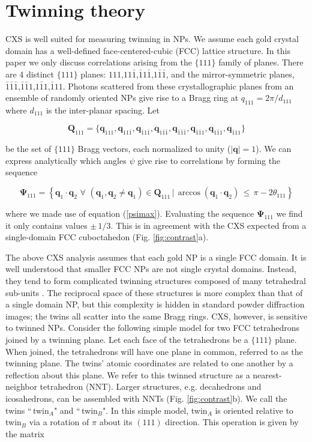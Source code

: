 \documentclass [12pt,fleqn]{article}
\def \be {\begin{equation}}
\def \ee {\end{equation}}
\begin{document}
\section{Twinning theory}
CXS is well suited for measuring twinning in NPs. We assume each gold crystal domain has a well-defined face-centered-cubic (FCC) lattice structure. In this paper we only discuss correlations arising from the $\{111\}$ family of planes. There are 4 distinct $\{111\}$ planes: $111$,$11\bar 1$,$\bar 1 1\bar 1$,$1\bar 1 \bar 1$, and the mirror-symmetric planes, $\bar 1\bar 1\bar 1$,$\bar 1\bar 1 1$,$1 \bar 11$,$\bar 1 1 1$.  Photons scattered from these crystallographic planes from an ensemble of randomly oriented NPs give rise to a Bragg ring at  $q_{111} = 2\pi / d_{111} $ where $d_{111}$ is the inter-planar spacing. Let 

\be
\bm Q_{111} = \big \{\bm q_{111}, \bm q_{11\bar 1},\bm q_{\bar 1 1\bar 1},\bm q_{1\bar 1 \bar 1},\bm q_{\bar 1\bar 1\bar 1},\bm q_{\bar 1\bar 1 1},\bm q_{1 \bar 11},\bm q_{\bar 1 1 1} \big\}
\ee

be the set of $\{111\}$ Bragg vectors, each normalized to unity ($|\bm q| =1$). We can express analytically which angles $\psi$ give rise to correlations by forming the sequence

\be \label{psiset}
\bm {\Psi}_{111} = \left \{ \bm q_1\cdot \bm q_2 \, \,\forall \, \, (\bm q_1, \bm q_2 \ne \bm q_1) \in \bm Q_{111}\,  \big | \,  \arccos ( \bm q_1 \cdot \bm q_2 )   \, \le \,  \pi - 2\theta_{111}   \right \}
\ee 

where we made use of equation (\ref{psimax}). Evaluating the sequence $\bm {\Psi}_{111}$ we find it only contains values $\pm\, 1/3$. This is in agreement with the CXS expected from a single-domain FCC cuboctahedon (Fig. \ref{fig:contrast}a).

The above CXS analysis assumes that each gold NP is a single FCC domain. It is well understood that smaller FCC NPs are not single crystal domains. Instead, they tend to form complicated twinning structures composed of many tetrahedral sub-units \cite{marks1981high}. The reciprocal space of these structures is more complex than that of a single domain NP, but this complexity is hidden in standard powder diffraction images; the twins all scatter into the same Bragg rings. CXS, however, is sensitive to twinned NPs. Consider the following simple model for two FCC tetrahedrons joined by a twinning plane. Let each face of the tetrahedrons be a $\{111\}$ plane. When joined, the tetrahedrons will have one plane in common, referred to as the twinning plane. The twins' atomic coordinates are related to one another by a reflection about this plane. We refer to this twinned structure as a nearest-neighbor tetrahedron (NNT). Larger structures, e.g. decahedrons and icosahedrons, can be assembled with NNTs (Fig. \ref{fig:contrast}b). We call the twins ``\,twin$_A$" and ``\,twin$_B$".  In this simple model, twin$_A$ is oriented relative to twin$_B$ via a rotation of $\pi$ about its $(111)$ direction. This operation is given by the matrix
\end{document}
